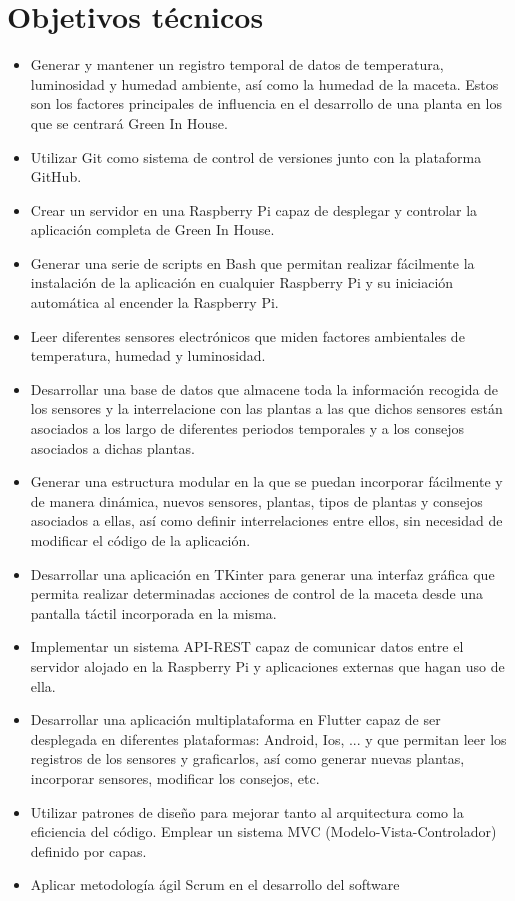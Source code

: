 \section{Objetivos técnicos}
\begin{itemize}
    \item Generar y mantener un registro temporal de datos de temperatura, luminosidad y humedad ambiente, así como la humedad de la maceta. Estos son los factores principales de influencia en el desarrollo de una planta en los que se centrará Green In House.
    \item Utilizar Git como sistema de control de versiones junto con
    la plataforma GitHub.
    \item Crear un servidor en una Raspberry Pi capaz de desplegar y controlar la aplicación completa de Green In House.
    \item Generar una serie de scripts en Bash que permitan realizar fácilmente la instalación de la aplicación en cualquier Raspberry Pi y su iniciación automática al encender la Raspberry Pi.
    \item Leer diferentes sensores electrónicos que miden factores ambientales de temperatura, humedad y luminosidad.
    \item Desarrollar una base de datos que almacene toda la información recogida de los sensores y la interrelacione con las plantas a las que dichos sensores están asociados a los largo de diferentes periodos temporales y a los consejos asociados a dichas plantas.
    \item Generar una estructura modular en la que se puedan incorporar fácilmente y de manera dinámica, nuevos sensores, plantas, tipos de plantas y consejos asociados a ellas, así como definir interrelaciones entre ellos, sin necesidad de modificar el código de la aplicación.
    \item Desarrollar una aplicación en TKinter para generar una interfaz gráfica que permita realizar determinadas acciones de control de la maceta desde una pantalla táctil incorporada en la misma. 
    \item Implementar un sistema API-REST capaz de comunicar datos entre el servidor alojado en la Raspberry Pi y aplicaciones externas que hagan uso de ella.  
    \item Desarrollar una aplicación multiplataforma en Flutter capaz de ser desplegada en diferentes plataformas: Android, Ios, ... y que permitan leer los registros de los sensores y graficarlos, así como generar nuevas plantas, incorporar sensores, modificar los consejos, etc.   
    \item Utilizar patrones de diseño para mejorar tanto al arquitectura como la eficiencia del código. Emplear un sistema MVC (Modelo-Vista-Controlador) definido por capas.   
    \item Aplicar metodología ágil Scrum en el desarrollo del software 
    
\end{itemize}

